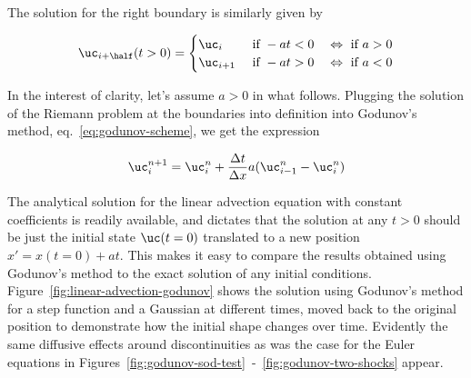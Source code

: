 The solution for the right boundary is similarly given by

\begin{align}
    \uc_{i+\half}(t>0) =
                \begin{cases}
                    \uc_{i} & \text{ if } - at < 0  \quad \Leftrightarrow \text{ if } a > 0  \\
                    \uc_{i+1} & \text{ if } - at > 0 \quad \Leftrightarrow \text{ if } a < 0
                \end{cases}
\end{align}



In the interest of clarity, let's assume $a > 0$ in what follows.
Plugging the solution of the Riemann problem at the boundaries into definition into Godunov's
method, eq.~\ref{eq:godunov-scheme}, we get the expression

\begin{align}
    \uc_i^{n+1} = \uc_i^n + \frac{\Delta t}{\Delta x} a (\uc^{n}_{i-1} - \uc^{n}_{i})
\label{eq:godunov-advection}
\end{align}

The analytical solution for the linear advection equation with constant coefficients is
readily available, and dictates that the solution at any $t > 0$ should be just the initial state
$\uc (t = 0)$ translated to a new position $x' = x(t=0) + at$. This makes it easy to compare
the results obtained using Godunov's method to the exact solution of any initial conditions.
Figure~\ref{fig:linear-advection-godunov} shows the solution using Godunov's method for a step
function and a Gaussian at different times, moved back to the original position to demonstrate how
the initial shape changes over time. Evidently the same diffusive effects around discontinuities as
was the case for the Euler equations in
Figures~\ref{fig:godunov-sod-test}~-~\ref{fig:godunov-two-shocks} appear.


